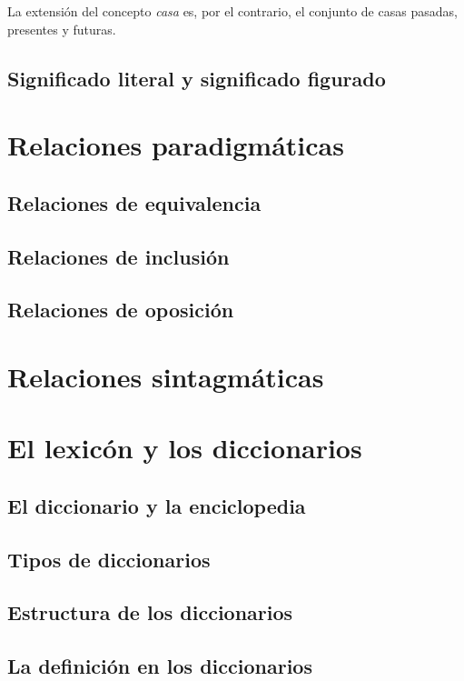 \documentclass[12pt]{article}
\begin{document}
La extensión del concepto \textit{casa} es, por el contrario, el conjunto de casas pasadas, presentes y futuras.

\subsection{Significado literal y significado figurado}
\section{Relaciones paradigmáticas}
\subsection{Relaciones de equivalencia}
\subsection{Relaciones de inclusión}
\subsection{Relaciones de oposición}
\section{Relaciones sintagmáticas}
\section{El lexicón y los diccionarios}
\subsection{El diccionario y la enciclopedia}
\subsection{Tipos de diccionarios}
\subsection{Estructura de los diccionarios}
\subsection{La definición en los diccionarios}



\end{document}
